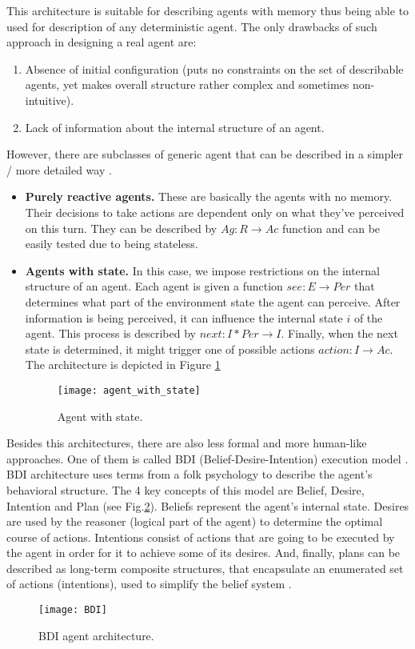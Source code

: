 This architecture is suitable for describing agents with memory thus being able to used for description of any deterministic agent.
The only drawbacks of such approach in designing a real agent are:
\begin{enumerate}
  \item Absence of initial configuration (puts no constraints on the set of describable agents, yet makes overall structure rather complex and sometimes non-intuitive).
  \item Lack of information about the internal structure of an agent.
\end{enumerate}
However, there are subclasses of generic agent that can be described in a simpler / more detailed way \cite{DUMMY:1}.
\begin{itemize}
\item \textbf{Purely reactive agents.} These are basically the agents with no memory. Their decisions to take actions are dependent only on what they've perceived on this turn. They can be described by \(Ag : R\rightarrow Ac\) function and can be easily tested due to being stateless.
\item \textbf{Agents with state.} In this case, we impose restrictions on the internal structure of an agent. Each agent is given a function \(see : E\rightarrow Per\) that determines what part of the environment state the agent can perceive. After information is being perceived, it can influence the internal state $i$ of the agent. This process is described by \(next : I*Per\rightarrow I\). Finally, when the next state is determined, it might trigger one of possible actions \(action: I\rightarrow Ac\). The architecture is depicted in Figure \ref{StateAgent}
    \begin{figure}[h!]
     \begin{center}
      \texttt{[image: agent\_with\_state]}
      \caption{Agent with state.}
      \label{StateAgent}
      \end{center}
    \end{figure}
\end{itemize}
Besides this architectures, there are also less formal and more human-like approaches.
One of them is called BDI (Belief-Desire-Intention) execution model \cite{DUMMY:1}.
BDI architecture uses terms from a folk psychology to describe the agent's behavioral structure. The 4 key concepts of this model are Belief, Desire, Intention and Plan (see Fig.\ref{BDIAgent}). Beliefs represent the agent's internal state. Desires are used by the reasoner (logical part of the agent) to determine the optimal course of actions. Intentions consist of actions that are going to be executed by the agent in order for it to achieve some of its desires. And, finally, plans can be described as long-term composite structures, that encapsulate an enumerated set of actions (intentions), used to simplify the belief system \cite[p.~150]{DUMMY:2}.
    \begin{figure}[h!]
      \begin{center}
      \texttt{[image: BDI]}
      \caption{BDI agent architecture.}
      \label{BDIAgent}
      \end{center}
    \end{figure}

